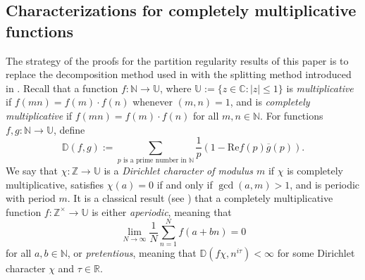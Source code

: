 \documentclass[11pt]{amsart}
\theoremstyle{definition}
\newtheorem{definition}[lemma]{Definition}
\newcommand{\C}{{\mathbb C}}
\newcommand{\D}{{\mathbb D}}
\newcommand{\N}{{\mathbb N}}
\newcommand{\R}{{\mathbb R}}
\newcommand{\Z}{{\mathbb Z}}
\newcommand{\U}{{\mathbb U}}
\newcommand{\WS}[1]{{\color{blue}{{#1}}}}
\begin{document}
 
 \subsection{Characterizations for completely multiplicative functions}


The strategy of the proofs for the partition regularity results of this paper is to replace the decomposition method used in \cite{S18,S23} with the splitting method introduced in \cite{FKM2,FKM1}. %
%
Recall that a function $f\colon \N\to\U$, where $\U:=\{z \in\C: |z| \leq 1\}$ is \emph{multiplicative} if $f(mn)=f(m)\cdot f(n)$ whenever $(m,n)=1$, and is \emph{completely multiplicative} if $f(mn)=f(m)\cdot f(n)$ for all $m,n\in\N$.
For functions $f,g: \N\to\U$, define
$$\D(f,g):=\sum_{p \text{ is a prime number in } \N} \frac{1}{p}(1-\text{Re}f(p)\overline{g}(p)).$$
We say that $\chi : \Z \to \U$ is a \emph{Dirichlet character of modulus $m$} if $\chi$ is completely multiplicative, satisfies $\chi(a)=0$ if and only if $\gcd(a,m)>1$, and is periodic with period $m$. It is a classical result (see \cite[Corollary~1]{daboussidelange82}) that a completely multiplicative function $f\colon \Z^{\times}\to\U$ is either \emph{aperiodic}, meaning that
$$\lim_{N\to\infty}\frac{1}{N}\sum_{n=1}^{N}f(a+bn)=0$$
for all $a,b\in\N$, or \emph{pretentious}, meaning that $\D(f\chi,n^{i\tau})<\infty$ for some Dirichlet character $\chi$ and $\tau\in\R$.



\end{document}

